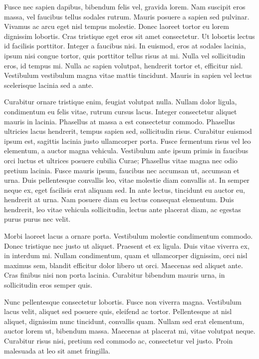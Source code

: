 \documentclass[aps,prc,reprint,amsmath,superscriptaddress]{revtex4-1}
\begin{document}
Fusce nec sapien dapibus, bibendum felis vel, gravida lorem. Nam suscipit eros massa, vel faucibus tellus sodales rutrum. Mauris posuere a sapien sed pulvinar. Vivamus ac arcu eget nisl tempus molestie. Donec laoreet tortor eu lorem dignissim lobortis. Cras tristique eget eros sit amet consectetur. Ut lobortis lectus id facilisis porttitor. Integer a faucibus nisi. In euismod, eros at sodales lacinia, ipsum nisi congue tortor, quis porttitor tellus risus at mi. Nulla vel sollicitudin eros, id tempus mi. Nulla ac sapien volutpat, hendrerit tortor et, efficitur nisl. Vestibulum vestibulum magna vitae mattis tincidunt. Mauris in sapien vel lectus scelerisque lacinia sed a ante.

Curabitur ornare tristique enim, feugiat volutpat nulla. Nullam dolor ligula, condimentum eu felis vitae, rutrum cursus lacus. Integer consectetur aliquet mauris in lacinia. Phasellus at massa a est consectetur commodo. Phasellus ultricies lacus hendrerit, tempus sapien sed, sollicitudin risus. Curabitur euismod ipsum est, sagittis lacinia justo ullamcorper porta. Fusce fermentum risus vel leo elementum, a auctor magna vehicula. Vestibulum ante ipsum primis in faucibus orci luctus et ultrices posuere cubilia Curae; Phasellus vitae magna nec odio pretium lacinia. Fusce mauris ipsum, faucibus nec accumsan ut, accumsan et urna. Duis pellentesque convallis leo, vitae molestie diam convallis at. In semper neque ex, eget facilisis erat aliquam sed. In ante lectus, tincidunt eu auctor eu, hendrerit at urna. Nam posuere diam eu lectus consequat elementum. Duis hendrerit, leo vitae vehicula sollicitudin, lectus ante placerat diam, ac egestas purus purus nec velit.

Morbi laoreet lacus a ornare porta. Vestibulum molestie condimentum commodo. Donec tristique nec justo ut aliquet. Praesent et ex ligula. Duis vitae viverra ex, in interdum mi. Nullam condimentum, quam et ullamcorper dignissim, orci nisl maximus sem, blandit efficitur dolor libero ut orci. Maecenas sed aliquet ante. Cras finibus nisi non porta lacinia. Curabitur bibendum mauris urna, in sollicitudin eros semper quis.

Nunc pellentesque consectetur lobortis. Fusce non viverra magna. Vestibulum lacus velit, aliquet sed posuere quis, eleifend ac tortor. Pellentesque at nisl aliquet, dignissim nunc tincidunt, convallis quam. Nullam sed erat elementum, auctor lorem ut, bibendum massa. Maecenas at placerat mi, vitae volutpat neque. Curabitur risus nisi, pretium sed commodo ac, consectetur vel justo. Proin malesuada at leo sit amet fringilla.
\end{document}
